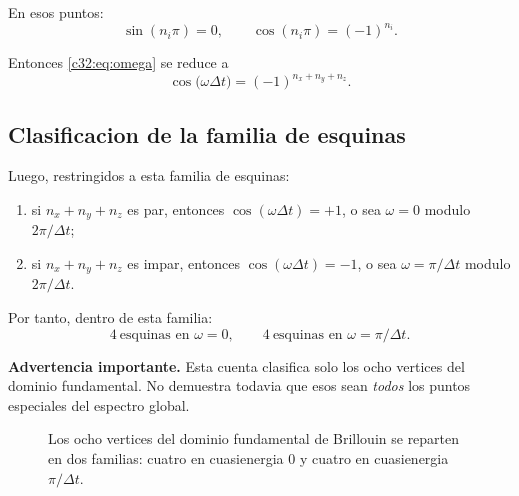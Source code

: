 En esos puntos:
\begin{equation}
\sin(n_i\pi)=0,
\qquad
\cos(n_i\pi)=(-1)^{n_i}.
\end{equation}

Entonces \eqref{c32:eq:omega} se reduce a
\begin{equation}
\cos\!\bigl(\omega\Delta t\bigr)
=
(-1)^{n_x+n_y+n_z}.
\label{c32:eq:corneromega}
\end{equation}

\subsection{Clasificacion de la familia de esquinas}
Luego, restringidos a esta familia de esquinas:
\begin{enumerate}[label=\arabic*.]
    \item si \(n_x+n_y+n_z\) es par, entonces \(\cos(\omega\Delta t)=+1\), o sea \(\omega=0\) modulo \(2\pi/\Delta t\);
    \item si \(n_x+n_y+n_z\) es impar, entonces \(\cos(\omega\Delta t)=-1\), o sea \(\omega=\pi/\Delta t\) modulo \(2\pi/\Delta t\).
\end{enumerate}

Por tanto, dentro de esta familia:
\begin{equation}
\boxed{
4\ \text{esquinas en } \omega=0,
\qquad
4\ \text{esquinas en } \omega=\pi/\Delta t.
}
\label{c32:eq:fourfour}
\end{equation}

\begin{displayquote}
\textbf{Advertencia importante.} Esta cuenta clasifica solo los ocho vertices del dominio fundamental. No demuestra todavia que esos sean \emph{todos} los puntos especiales del espectro global.
\end{displayquote}

\begin{figure}[h!]
\centering
{}
\caption{Los ocho vertices del dominio fundamental de Brillouin se reparten en dos familias: cuatro en cuasienergia \(0\) y cuatro en cuasienergia \(\pi/\Delta t\).}
\end{figure}

